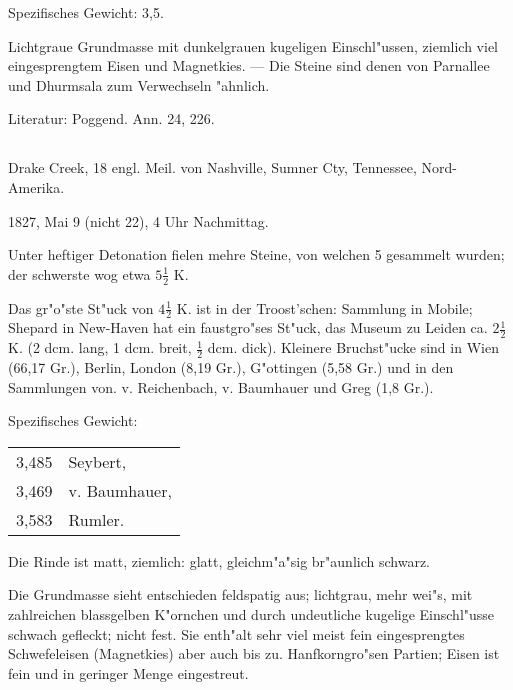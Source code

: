 \documentclass[a4paper, 11pt, oneside]{article}
\begin{document}
Spezifisches Gewicht: 3,5.

Lichtgraue Grundmasse mit dunkelgrauen kugeligen Einschl"ussen, ziemlich viel eingesprengtem Eisen und Magnetkies. --- Die Steine sind denen von Parnallee und Dhurmsala zum Verwechseln "ahnlich.

\normalsize
Literatur: Poggend. Ann. 24, 226.

\subsection{}
\LARGE
\paragraph{}
Drake Creek, 18 engl. Meil. von Nashville, Sumner Cty, Tennessee, Nord-Amerika.

1827, Mai 9 (nicht 22), 4 Uhr Nachmittag.

Unter heftiger Detonation fielen mehre Steine, von welchen 5 gesammelt wurden; der schwerste wog etwa $\mathfrak{5\frac{1}{2}}$ K.

Das gr"o"ste St"uck von $\mathfrak{4\frac{1}{2}}$ K. ist in der Troost'schen: Sammlung in Mobile; Shepard in New-Haven hat ein faustgro"ses St"uck, das Museum zu Leiden ca. $\mathfrak{2\frac{1}{2}}$ K. (2 dcm. lang, 1 dcm. breit, $\mathfrak{\frac{1}{2}}$ dcm. dick). Kleinere Bruchst"ucke sind in Wien (66,17 Gr.), Berlin, London (8,19 Gr.), G"ottingen (5,58 Gr.) und in den Sammlungen von. v. Reichenbach, v. Baumhauer und Greg (1,8 Gr.).

Spezifisches Gewicht:
\begin{table}[!ht]
    \centering\swabfamily\Large
    \begin{tabular}{l l}
        3,485 & Seybert,\\
        3,469 & v. Baumhauer,\\
        3,583 & Rumler.
    \end{tabular}
\end{table}

Die Rinde ist matt, ziemlich: glatt, gleichm"a"sig br"aunlich schwarz.

Die Grundmasse sieht entschieden feldspatig aus; lichtgrau, mehr wei"s, mit zahlreichen blassgelben K"ornchen und durch undeutliche kugelige Einschl"usse schwach gefleckt; nicht fest. Sie enth"alt sehr viel meist fein eingesprengtes Schwefeleisen (Magnetkies) aber auch bis zu. Hanfkorngro"sen Partien; Eisen ist fein und in geringer Menge eingestreut.
\end{document}
